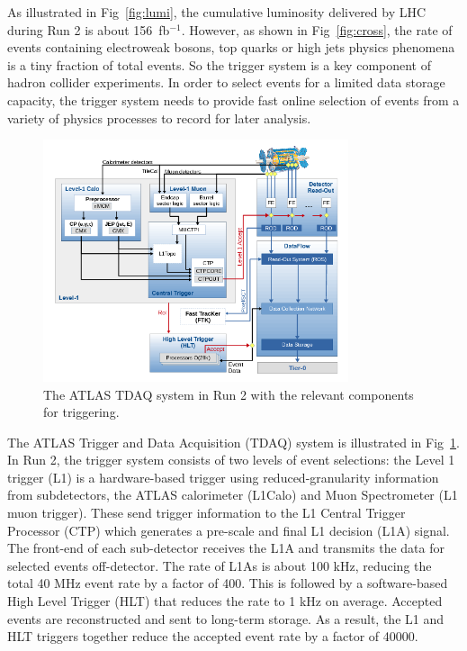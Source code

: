 \par As illustrated in Fig~\ref{fig:lumi}, the cumulative luminosity delivered by LHC during Run 2 is about 156~fb$^{-1}$. However, as shown in Fig~\ref{fig:cross}, the rate of events containing electroweak bosons, top quarks or high \pt jets physics phenomena is a tiny fraction of total events. So the trigger system is a key component of hadron collider experiments. In order to select events for a limited data storage capacity, the trigger system needs to provide fast online selection of events from a variety of physics processes to record for later analysis.

\begin{figure}[htbp!]
 \begin{center}
 \includegraphics[width=0.8\textwidth]{chapters/c4/figures/TDAQ}
 \end{center}
 \caption{The ATLAS TDAQ system in Run 2 with the relevant components for triggering. }
 \label{fig:TDAQ}
\end{figure}

\par The ATLAS Trigger and Data Acquisition (TDAQ) system \cite{Ruiz-Martinez:2133909} is illustrated in Fig~\ref{fig:TDAQ}. In Run 2, the trigger system consists of two levels of event selections: the Level 1 trigger (L1) is a hardware-based trigger using reduced-granularity information from subdetectors, the ATLAS calorimeter (L1Calo) and Muon Spectrometer (L1 muon trigger). These send trigger information to the L1 Central Trigger Processor (CTP) which generates a pre-scale and final L1 decision (L1A) signal. The front-end of each sub-detector receives the L1A and transmits the data for selected events off-detector. The rate of L1As is about 100 kHz, reducing the total 40 MHz event rate by a factor of 400. This is followed by a software-based High Level Trigger (HLT) that reduces the rate to 1 kHz on average. Accepted events are reconstructed and sent to long-term storage. As a result, the L1 and HLT triggers together reduce the accepted event rate by a factor of 40000.
